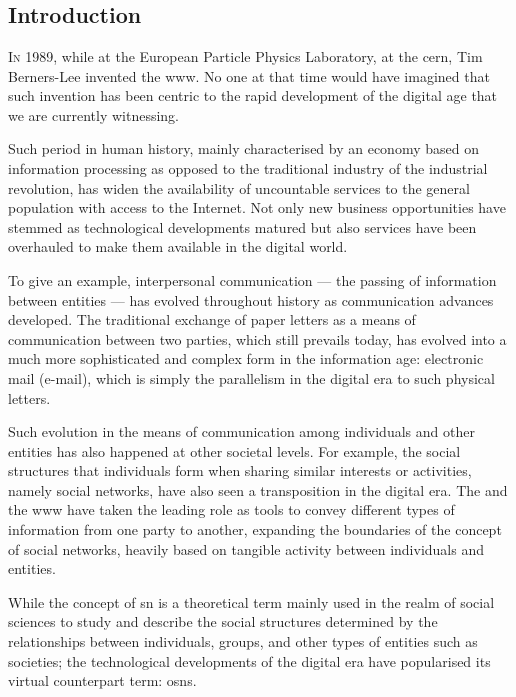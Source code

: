 \documentclass[showtrims,oldfontcommands]{kthesis}
\begin{document}
\mainmatter

\part*{}

\chapter{Introduction}
    \label{chapter:introduction}
\lettrine{\textcolor[gray]{.25}{I}}{n} 1989, while at the European Particle Physics 
Laboratory, at the \acf{cern}, Tim Berners-Lee invented the \Ac{www}. No one at that 
time would have imagined that such invention has been centric to the rapid development 
of the digital age that we are currently witnessing.

Such period in human history, mainly characterised by an economy based on information 
processing as opposed to the traditional industry of the industrial revolution, 
has widen the availability of uncountable services to the general population with 
access to the Internet. Not only new business opportunities have stemmed as technological 
developments matured but also services have been overhauled to make them available 
in the digital world.

To give an example, interpersonal communication --- the passing of information between 
entities --- has evolved throughout history as communication advances developed. 
The traditional exchange of paper letters as a means of communication between two 
parties, which still prevails today, has evolved into a much more sophisticated 
and complex form in the information age: electronic mail (e-mail), which is simply 
the parallelism in the digital era to such physical letters.

Such evolution in the means of communication among individuals and other entities 
has also happened at other societal levels. For example, the social structures that 
individuals form when sharing similar interests or activities, namely social networks, 
have also seen a transposition in the digital era. The \Internet and the \ac{www} 
have taken the leading role as tools to convey different types of information from 
one party to another, expanding the boundaries of the concept of social networks, 
heavily based on tangible activity between individuals and entities.

While the concept of \acl{sn} is a theoretical term mainly used in the realm of 
social sciences to study and describe the social structures determined by the relationships 
between individuals, groups, and other types of entities such as societies; the 
technological developments of the digital era have popularised its virtual counterpart 
term: \aclp{osn}.
\end{document}
